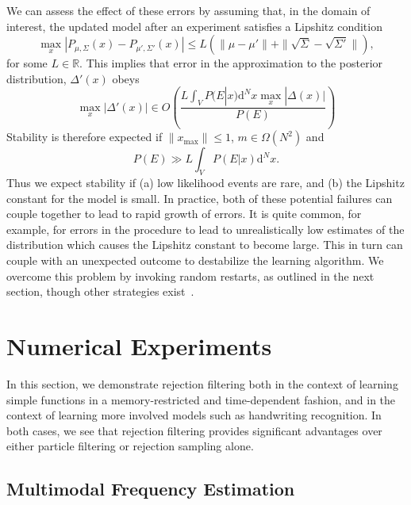 \documentclass[twoside]{article}
\begin{document}
We can assess the effect of these errors by assuming that, in the domain of interest, the updated model after an experiment satisfies a Lipshitz condition
\begin{equation}
\max_x|P_{\mu,\Sigma}(x) - P_{\mu' ,\Sigma'}(x)| \le L(\|\mu- \mu'\| +\|\sqrt{\Sigma}- \sqrt{\Sigma'}\|),
\end{equation}
for some $L\in \mathbb{R}$.  This implies that error in the approximation to the posterior distribution, $\Delta'(x)$ obeys
\begin{equation}
\max_x |\Delta'(x)| \in O\left( \frac{L\int_V P(E|x) \mathrm{d}^Nx \max_x |\Delta(x)|}{P(E)}\right)
\end{equation}
Stability is therefore expected if $\|x_{\max}\|\le 1$, $m\in \Omega(N^2)$ and
\begin{equation}
P(E) \gg {L\int_V P(E|x) \mathrm{d}^Nx }.
\end{equation}
Thus we expect stability if (a) low likelihood events are rare, and (b) the Lipshitz constant for the model is small.  In practice, both of these potential failures can couple together to lead to rapid growth of errors.  It is quite common, for example, for errors in the procedure to lead to unrealistically low estimates of the distribution which causes the Lipshitz constant to become large.  This in turn can couple with an unexpected outcome to destabilize the learning algorithm. 
We overcome this problem by invoking random restarts, as outlined in the next section,
though other strategies exist~\cite{wiebe_efficient_2015}.

\section{Numerical Experiments}
\label{sec:numerical-experiments}

In this section, we demonstrate rejection filtering both in the context of
learning simple functions in a memory-restricted and time-dependent fashion,
and in the context of learning more involved models such as handwriting
recognition. In both cases, we see that rejection filtering provides significant
advantages over either particle filtering or rejection sampling alone.

\subsection{Multimodal Frequency Estimation}
\end{document}
